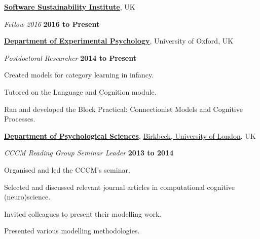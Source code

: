 \blankline

\href{http://www.software.ac.uk/}{\textbf{Software Sustainability Institute}}, UK

\begin{outerlist}


\item[] \textit{Fellow 2016}
        \hfill \textbf{2016 to Present}

\end{outerlist}

\blankline


\href{http://www.psy.ox.ac.uk/}{\textbf{Department of Experimental Psychology}}, University of Oxford, UK

\begin{outerlist}


\item[] \textit{Postdoctoral Researcher}
        \hfill \textbf{2014 to Present}
\begin{innerlist}
\item Created models for category learning in infancy.
\item Tutored on the Language and Cognition module.
\item Ran and developed the Block Practical: Connectionist Models and Cognitive Processes.
\end{innerlist}
\end{outerlist}

\blankline


\href{http://www.bbk.ac.uk/psychology/}{\textbf{Department of Psychological Sciences}}, \href{http://www.bbk.ac.uk/}{Birkbeck, University of London},
UK

\begin{outerlist}


\item[] \textit{CCCM Reading Group Seminar Leader}
        \hfill \textbf{2013 to 2014}
\begin{innerlist}
\item Organised and led the CCCM's  seminar. 
\item Selected and discussed relevant journal articles in computational cognitive (neuro)science.
\item Invited colleagues to present their modelling work.
\item Presented various modelling methodologies.
\end{innerlist}
\end{outerlist}



